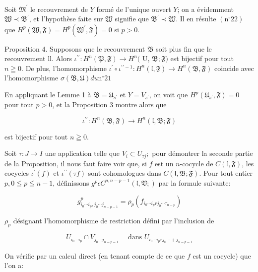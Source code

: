 Soit $\mathfrak{M}^{\prime}$ le recouvrement de $Y$ formé de l'unique ouvert $Y$; on a évidemment $\mathfrak{W} \prec \mathfrak{B}^{\prime}$, et l'hypothèse faite sur $\mathfrak{W}$ signifie que $\mathfrak{B}^{\prime} \prec \mathfrak{W}$. Il en résulte $\left(\mathrm{n}^{\circ} 22\right)$ que $H^{p}(\mathfrak{W}, \mathfrak{F})=H^{p}\left(\mathfrak{W}^{\prime}, \mathfrak{F}\right)=0$ si $p>0$.

Proposition 4. Supposons que le recouvrement $\mathfrak{B}$ soit plus fin que le recouvrement ll. Alors $\iota^{\prime \prime}: H^{n}(\mathfrak{P}, \mathfrak{F}) \rightarrow H^{n}($ U, $\mathfrak{B} ; \mathfrak{F})$ est bijectif pour tout $n \geqq 0 .$ De plus, l'homomorphisme $\iota^{\prime} \circ \iota^{\prime \prime-1}: H^{n}(\mathfrak{l}, \mathfrak{F}) \rightarrow H^{n}(\mathfrak{B}, \mathfrak{F})$ coincide avec l'homomorphisme $\sigma(\mathfrak{B}, \mathfrak{U}) d u \mathrm{n}^{\circ} 21$

En appliquant le Lemme 1 à $\mathfrak{B}=\mathfrak{U}_{s^{\prime}}$ et $Y=V_{s^{\prime}}$, on voit que $H^{p}\left(\mathfrak{U}_{s^{\prime}}, \mathfrak{F}\right)=0$ pour tout $p>0$, et la Proposition 3 montre alors que

$$
\iota^{\prime \prime}: H^{n}(\mathfrak{B}, \mathfrak{F}) \rightarrow H^{n}(\mathfrak{l}, \mathfrak{B} ; \mathfrak{F})
$$

est bijectif pour tout $n \geqq 0$.

Soit $\tau: J \rightarrow I$ une application telle que $V_{i} \subset U_{\tau j} ;$ pour démontrer la seconde partie de la Proposition, il nous faut faire voir que, si $f$ est un $n$-cocycle de $C(\mathbb{l}, \mathfrak{F})$, les cocycles $\iota^{\prime}(f)$ et $\iota^{\prime \prime}(\tau f)$ sont cohomologues dans $C(\mathfrak{l}, \mathfrak{B} ; \mathfrak{F})$. Pour tout entier $p, 0 \leqq p \leqq n-1$, définissons $g^{p} \epsilon C^{p, n-p-1}(\mathfrak{l}, \mathfrak{V} ; \mathfrak{})$ par la formule suivante:

$$
g_{i_{0} \cdots i_{p}, j_{0} \cdots j_{n-p-1}}^{p}=\rho_{p}\left(f_{i_{0} \cdots i_{p} r j_{0} \cdots \tau_{n-p}}\right)
$$

$\rho_{p}$ désignant l'homomorphisme de restriction défini par l'inclusion de

$$
U_{i_{0} \cdots i_{p}} \cap V_{j_{0} \cdots j_{n-p-1}} \quad \text { dans } U_{i_{0} \cdots i_{p} r j_{0} \cdots+j_{n-p-1}}
$$

On vérifie par un calcul direct (en tenant compte de ce que $f$ est un cocycle) que l'on a:

